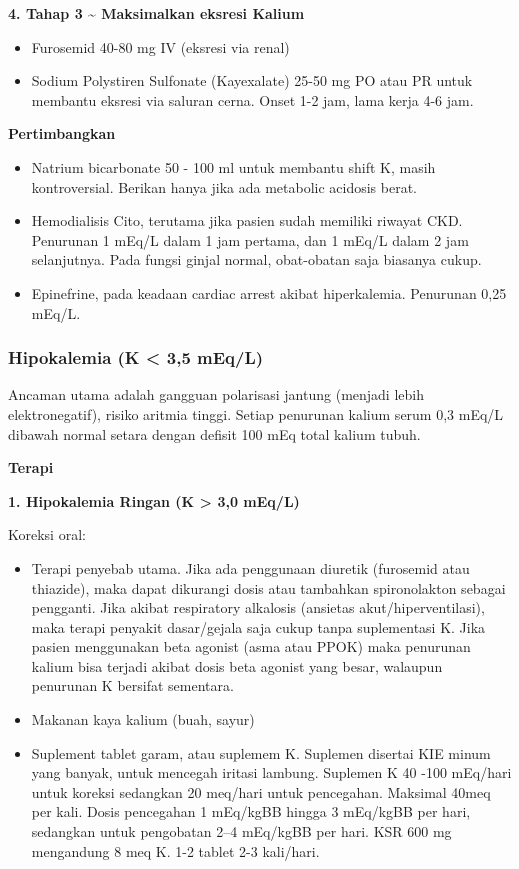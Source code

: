 \documentclass[
]{book}
\providecommand{\tightlist}{%
  \setlength{\itemsep}{0pt}\setlength{\parskip}{0pt}}
\begin{document}
\textbf{4. Tahap 3 \textasciitilde{} Maksimalkan eksresi Kalium}

\begin{itemize}
\tightlist
\item
  Furosemid 40-80 mg IV (eksresi via renal)
\item
  Sodium Polystiren Sulfonate (Kayexalate) 25-50 mg PO atau PR untuk membantu eksresi via saluran cerna. Onset 1-2 jam, lama kerja 4-6 jam.
\end{itemize}

\textbf{Pertimbangkan}

\begin{itemize}
\tightlist
\item
  Natrium bicarbonate 50 - 100 ml untuk membantu shift K, masih kontroversial. Berikan hanya jika ada metabolic acidosis berat.
\item
  Hemodialisis Cito, terutama jika pasien sudah memiliki riwayat CKD. Penurunan 1 mEq/L dalam 1 jam pertama, dan 1 mEq/L dalam 2 jam selanjutnya. Pada fungsi ginjal normal, obat-obatan saja biasanya cukup.
\item
  Epinefrine, pada keadaan cardiac arrest akibat hiperkalemia. Penurunan 0,25 mEq/L.
\end{itemize}

\hypertarget{hipokalemia-k-35-meql}{%
\subsubsection{Hipokalemia (K \textless{} 3,5 mEq/L)}\label{hipokalemia-k-35-meql}}

Ancaman utama adalah gangguan polarisasi jantung (menjadi lebih elektronegatif), risiko aritmia tinggi. Setiap penurunan kalium serum 0,3 mEq/L dibawah normal setara dengan defisit 100 mEq total kalium tubuh.

\textbf{Terapi}

\textbf{1. Hipokalemia Ringan (K \textgreater{} 3,0 mEq/L)}

Koreksi oral:

\begin{itemize}
\tightlist
\item
  Terapi penyebab utama. Jika ada penggunaan diuretik (furosemid atau thiazide), maka dapat dikurangi dosis atau tambahkan spironolakton sebagai pengganti. Jika akibat respiratory alkalosis (ansietas akut/hiperventilasi), maka terapi penyakit dasar/gejala saja cukup tanpa suplementasi K. Jika pasien menggunakan beta agonist (asma atau PPOK) maka penurunan kalium bisa terjadi akibat dosis beta agonist yang besar, walaupun penurunan K bersifat sementara.
\item
  Makanan kaya kalium (buah, sayur)
\item
  Suplement tablet garam, atau suplemem K. Suplemen disertai KIE minum yang banyak, untuk mencegah iritasi lambung. Suplemen K 40 -100 mEq/hari untuk koreksi sedangkan 20 meq/hari untuk pencegahan. Maksimal 40meq per kali. Dosis pencegahan 1 mEq/kgBB hingga 3 mEq/kgBB per hari, sedangkan untuk pengobatan 2--4 mEq/kgBB per hari. KSR 600 mg mengandung 8 meq K. 1-2 tablet 2-3 kali/hari.
\end{itemize}
\end{document}
